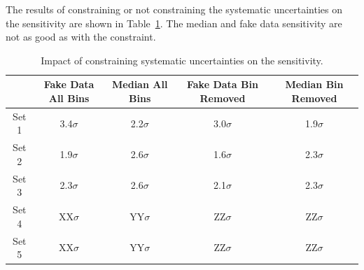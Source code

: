 The results of constraining or not constraining the systematic uncertainties on the sensitivity are shown in Table~\ref{tab:fakedata:noconstrain}.  The median and fake data sensitivity are not as good as with the constraint.

\begin{table}[h!]
\centering
\begin{center}
\begin{tabular}{ c|c|c|c|c } 
 & Fake Data All Bins & Median All Bins & Fake Data Bin Removed & Median Bin Removed\\ 
\hline \hline
 Set 1 & 3.4$\sigma$ & 2.2$\sigma$& 3.0$\sigma$ & 1.9$\sigma$  \\ 
 Set 2 & 1.9$\sigma$ & 2.6$\sigma$ & 1.6$\sigma$ & 2.3$\sigma$  \\ 
 Set 3 & 2.3$\sigma$ & 2.6$\sigma$& 2.1$\sigma$ & 2.3$\sigma$ \\ 
 Set 4 & XX$\sigma$ & YY$\sigma$ & ZZ$\sigma$& ZZ$\sigma$\\ 
 Set 5 & XX$\sigma$ & YY$\sigma$ & ZZ$\sigma$ & ZZ$\sigma$  \\ 
 \hline \hline
\end{tabular}
\end{center}
\caption{Impact of constraining systematic uncertainties on the sensitivity.}
\label{tab:fakedata:noconstrain}
\end{table}